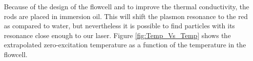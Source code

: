 \documentclass[twocolumn]{article}
\begin{document}
Because of the design of the flowcell and to improve the thermal conductivity,
the rods are placed in immersion oil. This will shift the plasmon resonance to
the red as compared to water, but nevertheless it is possible to find particles
with its resonance close enough to our laser. Figure \ref{fig:Temp_Vs_Temp}
shows the extrapolated zero-excitation temperature as a function of the
temperature in the flowcell. 
\end{document}
